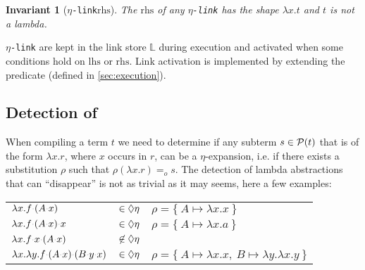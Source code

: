 \documentclass[sigconf,natbib=false,review]{acmart}
\newtheorem{invariant}{Invariant}
\newcommand{\appsep}{\ensuremath{\textcolor{lightgray}{\cdot}}}
\newcommand{\EqualRel}{\ensuremath{=}}
\newcommand{\Eo}{\ensuremath{\EqualRel_o}\xspace}
\newcommand{\linkMacro}[1]{\ensuremath{#1}\texttt{-link}\xspace}
\newcommand{\linketa} {\linkMacro{\eta}}
\newcommand{\lhs}{\ensuremath{\mathrm{lhs}}\xspace}
\newcommand{\rhs}{\ensuremath{\mathrm{rhs}}\xspace}
\newcommand{\linkStore}{\ensuremath{\mathbb{L}}\xspace}
\begin{document}
\begin{invariant}[\linketa \rhs]
  The \rhs of any \linketa %
  has the shape $\lambda x.t$
  and $t$ is not a lambda. 
  \label{inv:link-eta-right}
\end{invariant}

\linketa are kept in the link store \linkStore during execution
and activated when some conditions hold on \lhs or \rhs.
Link activation is implemented by extending the 
predicate (defined in \cref{sec:execution}).

\subsection{Detection of \maybeeta}\label{sec:etadetection}

When compiling a term $t$ we need to determine if any
subterm $s \in \mathcal{P}(t)$ that is of the form $\lambda x. r$,
where $x$ occurs in $r$, can be a $\eta$-expansion, i.e. if
there exists a substitution $\rho$ such that $\rho (\lambda x.r) \Eo s$.
The detection of lambda abstractions that can ``disappear''
is not as trivial as it may seems, here a few examples:
%
\begin{center}
  \begin{tabular}{lll}
    $\lambda x. f \appsep (A \appsep x)$ & $\in\Diamond\eta$ & $\rho = \{~ A \mapsto \lambda x.x ~\}$ \\
    $\lambda x. f \appsep (A \appsep x) \appsep x$ & $\in\Diamond\eta$ & $\rho = \{~ A \mapsto \lambda x.a ~\}$\\
    $\lambda x. f \appsep x \appsep (A \appsep x)$ & $\not\in\Diamond\eta$ &\\
    $\lambda x. \lambda y. f \appsep (A \appsep x) \appsep (B \appsep y \appsep x)$ & $\in\Diamond\eta$ & $\rho = \{~ A \mapsto \lambda x.x,~ B \mapsto \lambda y.\lambda x.y ~\}$
  \end{tabular}
\end{center}
\vspace{4pt}
\end{document}
